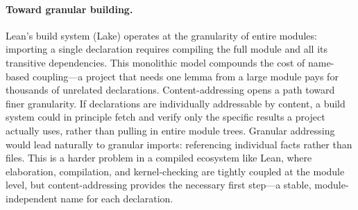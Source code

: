   \paragraph{Toward granular building.}
  Lean's build system (Lake) operates at the granularity of entire
  modules: importing a single declaration requires compiling the full
  module and all its transitive dependencies.  This monolithic model
  compounds the cost of name-based coupling---a project that needs one
  lemma from a large module pays for thousands of unrelated declarations.
  Content-addressing opens a path toward finer granularity.  If
  declarations are individually addressable by content, a build system
  could in principle fetch and verify only the specific results a project
  actually uses, rather than pulling in entire module trees.  Granular
  addressing would lead naturally to granular imports: referencing
  individual facts rather than files.  This is a harder problem in a
  compiled ecosystem like Lean, where elaboration, compilation, and
  kernel-checking are tightly coupled at the module level, but
  content-addressing provides the necessary first step---a stable,
  module-independent name for each declaration.
  

